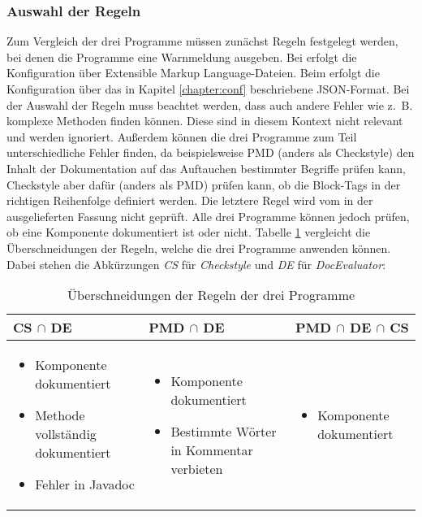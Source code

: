 \subsubsection{Auswahl der Regeln}
Zum Vergleich der drei Programme müssen zunächst Regeln festgelegt werden, bei denen die Programme eine Warnmeldung ausgeben. Bei \checkpmd{} erfolgt die Konfiguration über  Extensible Markup Language-Dateien. Beim \doceval erfolgt die Konfiguration über das in Kapitel \ref{chapter:conf} beschriebene \ac{JSON}-Format. Bei der Auswahl der Regeln muss beachtet werden, dass \checkpmd auch andere Fehler wie z.~B. komplexe Methoden finden können. Diese sind in diesem Kontext nicht relevant und werden ignoriert. Außerdem können die drei Programme zum Teil unterschiedliche Fehler finden, da beispielsweise PMD (anders als Checkstyle) den Inhalt der Dokumentation auf das Auftauchen bestimmter Begriffe prüfen kann, Checkstyle aber dafür (anders als PMD) prüfen kann, ob die Block-Tags in der richtigen Reihenfolge definiert werden. Die letztere Regel wird vom \doceval in der ausgelieferten Fassung nicht geprüft. Alle drei Programme können jedoch prüfen, ob eine Komponente dokumentiert ist oder nicht. Tabelle \ref{tab:inters_rules} vergleicht die Überschneidungen der Regeln, welche die drei Programme anwenden können. Dabei stehen die Abkürzungen \textit{CS} für \textit{Checkstyle} und \textit{DE} für \textit{DocEvaluator}:

\begin{table}[]
    \centering
    \begin{tabular}{m{4.5cm}|m{4.5cm}|m{4.5cm}}
     \textbf{CS} $\cap$ \textbf{DE}  & \textbf{PMD} $\cap$ \textbf{DE} & \textbf{PMD} $\cap$ \textbf{DE} $\cap$  \textbf{CS}  \\\hline
     \begin{itemize}
        \item Komponente dokumentiert
        \item Methode vollständig dokumentiert
         \item Fehler in Javadoc
     \end{itemize}
      & 
      \begin{itemize}
          \item  Komponente dokumentiert

          \item Bestimmte Wörter in Kommentar verbieten
      \end{itemize}
      & 
       \begin{itemize}
          \item  Komponente dokumentiert
         
      \end{itemize}
      \\\hline
    \end{tabular}
    \caption{Überschneidungen der Regeln der drei Programme}
    \label{tab:inters_rules}
\end{table}

